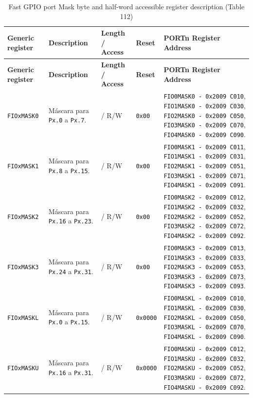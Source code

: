 \begin{longtable}{|>{\raggedright\arraybackslash}p{}|>{\raggedright\arraybackslash}p{}|>{\centering\arraybackslash}p{}|>{\centering\arraybackslash}p{}|>{\raggedright\arraybackslash}p{}|}
\caption{Fast GPIO port Mask byte and half-word accessible register description (Table 112)} \\
\hline
\textbf{Generic register} & \textbf{Description} & \textbf{Length / Access} & \textbf{Reset} & \textbf{PORTn Register Address} \\
\hline
\endfirsthead
\hline
\textbf{Generic register} & \textbf{Description} & \textbf{Length / Access} & \textbf{Reset} & \textbf{PORTn Register Address} \\
\hline
\endhead
\texttt{FIOxMASK0} & Máscara para \texttt{Px.0} a \texttt{Px.7}. & 8 / R/W & \texttt{0x00} & \texttt{FIO0MASK0 - 0x2009 C010}, \texttt{FIO1MASK0 - 0x2009 C030}, \texttt{FIO2MASK0 - 0x2009 C050}, \texttt{FIO3MASK0 - 0x2009 C070}, \texttt{FIO4MASK0 - 0x2009 C090}. \\
\hline
\texttt{FIOxMASK1} & Máscara para \texttt{Px.8} a \texttt{Px.15}. & 8 / R/W & \texttt{0x00} & \texttt{FIO0MASK1 - 0x2009 C011}, \texttt{FIO1MASK1 - 0x2009 C031}, \texttt{FIO2MASK1 - 0x2009 C051}, \texttt{FIO3MASK1 - 0x2009 C071}, \texttt{FIO4MASK1 - 0x2009 C091}. \\
\hline
\texttt{FIOxMASK2} & Máscara para \texttt{Px.16} a \texttt{Px.23}. & 8 / R/W & \texttt{0x00} & \texttt{FIO0MASK2 - 0x2009 C012}, \texttt{FIO1MASK2 - 0x2009 C032}, \texttt{FIO2MASK2 - 0x2009 C052}, \texttt{FIO3MASK2 - 0x2009 C072}, \texttt{FIO4MASK2 - 0x2009 C092}. \\
\hline
\texttt{FIOxMASK3} & Máscara para \texttt{Px.24} a \texttt{Px.31}. & 8 / R/W & \texttt{0x00} & \texttt{FIO0MASK3 - 0x2009 C013}, \texttt{FIO1MASK3 - 0x2009 C033}, \texttt{FIO2MASK3 - 0x2009 C053}, \texttt{FIO3MASK3 - 0x2009 C073}, \texttt{FIO4MASK3 - 0x2009 C093}. \\
\hline
\texttt{FIOxMASKL} & Máscara para \texttt{Px.0} a \texttt{Px.15}. & 16 / R/W & \texttt{0x0000} & \texttt{FIO0MASKL - 0x2009 C010}, \texttt{FIO1MASKL - 0x2009 C030}, \texttt{FIO2MASKL - 0x2009 C050}, \texttt{FIO3MASKL - 0x2009 C070}, \texttt{FIO4MASKL - 0x2009 C090}. \\
\hline
\texttt{FIOxMASKU} & Máscara para \texttt{Px.16} a \texttt{Px.31}. & 16 / R/W & \texttt{0x0000} & \texttt{FIO0MASKU - 0x2009 C012}, \texttt{FIO1MASKU - 0x2009 C032}, \texttt{FIO2MASKU - 0x2009 C052}, \texttt{FIO3MASKU - 0x2009 C072}, \texttt{FIO4MASKU - 0x2009 C092}. \\
\hline
\end{longtable}

